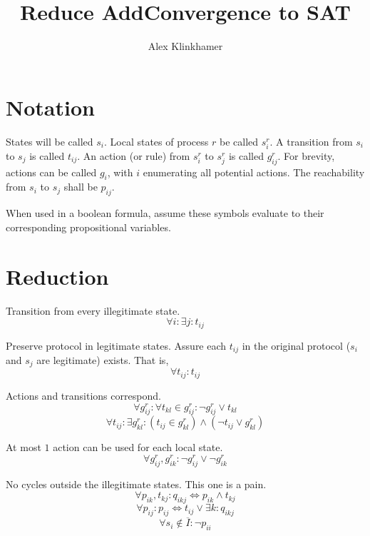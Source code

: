 



\title{Reduce AddConvergence to SAT}
\author{Alex Klinkhamer}
\maketitle

\section{Notation}
States will be called $s_i$.
Local states of process $r$ be called $s_i^r$.
A transition from $s_i$ to $s_j$ is called $t_{ij}$.
An action (or rule) from $s_i^r$ to $s_j^r$ is called $g_{ij}^r$.
For brevity, actions can be called $g_i$, with $i$ enumerating all potential actions.
The reachability from $s_i$ to $s_j$ shall be $p_{ij}$.

When used in a boolean formula, assume these symbols evaluate to their corresponding propositional variables.

\section{Reduction}
Transition from every illegitimate state.
$$\forall i:\exists j: t_{ij}$$

Preserve protocol in legitimate states.
Assure each $t_{ij}$ in the original protocol ($s_i$ and $s_j$ are legitimate) exists. That is, $$\forall t_{ij}: t_{ij}$$

Actions and transitions correspond.
$$\forall g_{ij}^r:\forall t_{kl}\in g_{ij}^r: \neg g_{ij}^r \vee t_{kl}$$
$$\forall t_{ij}:\exists g_{kl}^r: \left(t_{ij}\in g_{kl}^r\right) \wedge\left(\neg t_{ij}\vee g_{kl}^r\right)$$

At most $1$ action can be used for each local state.
$$\forall g_{ij}^r, g_{ik}^r: \neg g_{ij}^r \vee \neg g_{ik}^r$$

No cycles outside the illegitimate states.
This one is a pain.
$$\forall p_{ik},t_{kj}: q_{ikj}\iff p_{ik} \wedge t_{kj}$$
$$\forall p_{ij}: p_{ij}\iff t_{ij}\vee\exists k: q_{ikj}$$
$$\forall s_i\notin \overline{I}: \neg p_{ii}$$



